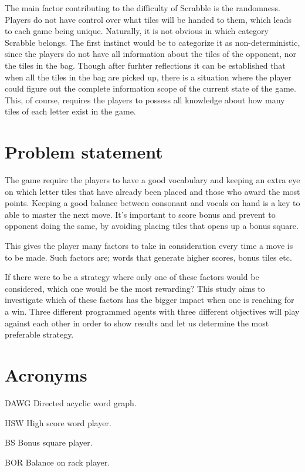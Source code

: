 \documentclass[a4paper, 12pt]{report}
\begin{document}
The main factor contributing to the difficulty of Scrabble is the randomness. Players do not have control over what tiles will be handed to them, which leads to each game being unique. Naturally, it is not obvious in which category Scrabble belongs. The first instinct would be to categorize it as non-deterministic, since the players do not have all information about the tiles of the opponent, nor the tiles in the bag. Though after furhter reflections it can be established that when all the tiles in the bag are picked up, there is a situation where the player could figure out the complete information scope of the current state of the game. This, of course, requires the players to possess all knowledge about how many tiles of each letter exist in the game.

\section{Problem statement}
The game require the players to have a good vocabulary and keeping an extra eye on which letter tiles that have already been placed and those who award the most points. Keeping a good balance between consonant and vocals on hand is a key to able to master the next move. It’s important to score bonus and prevent to opponent doing the same, by avoiding placing tiles that opens up a bonus square.

This gives the player many factors to take in consideration every time a move is to be made. Such factors are; words that generate higher scores, bonus tiles etc.

If there were to be a strategy where only one of these factors would be considered, which one would be the most rewarding? This study aims to investigate which of these factors has the bigger impact when one is reaching for a win. Three different programmed agents with three different objectives will play against each other in order to show results and let us determine the most preferable strategy.
\section {Acronyms}
\begin{description}
\item{DAWG} Directed acyclic word graph.
\item{HSW} High score word player.
\item{BS} Bonus square player.
\item{BOR} Balance on rack player.
\end{description}
\end{document}
